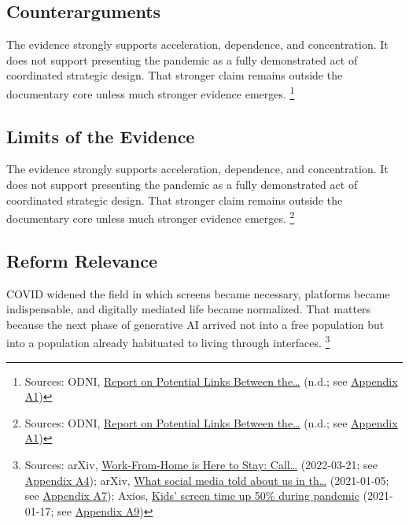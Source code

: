 \documentclass[
  american,
  11pt,
  letterpaper,
]{article}
\begin{document}
\subsection{Counterarguments}\label{counterarguments}

The evidence strongly supports acceleration, dependence, and
concentration. It does not support presenting the pandemic as a fully
demonstrated act of coordinated strategic design. That stronger claim
remains outside the documentary core unless much stronger evidence
emerges. \footnote{Sources: ODNI,
  \href{https://www.dni.gov/files/ODNI/documents/assessments/Report-on-Potential-Links-Between-the-Wuhan-Institute-of-Virology-and-the-Origins-of-COVID-19-20230623.pdf}{Report
  on Potential Links Between the\ldots{}} (n.d.; see
  \hyperref[appendix-a1-report-on-potential-links-between-the-wuhan-institute-of-virology-and-the-origins-of-covid-19]{Appendix
  A1})}

\subsection{Limits of the Evidence}\label{limits-of-the-evidence}

The evidence strongly supports acceleration, dependence, and
concentration. It does not support presenting the pandemic as a fully
demonstrated act of coordinated strategic design. That stronger claim
remains outside the documentary core unless much stronger evidence
emerges. \footnote{Sources: ODNI,
  \href{https://www.dni.gov/files/ODNI/documents/assessments/Report-on-Potential-Links-Between-the-Wuhan-Institute-of-Virology-and-the-Origins-of-COVID-19-20230623.pdf}{Report
  on Potential Links Between the\ldots{}} (n.d.; see
  \hyperref[appendix-a1-report-on-potential-links-between-the-wuhan-institute-of-virology-and-the-origins-of-covid-19]{Appendix
  A1})}

\subsection{Reform Relevance}\label{reform-relevance}

COVID widened the field in which screens became necessary, platforms
became indispensable, and digitally mediated life became normalized.
That matters because the next phase of generative AI arrived not into a
free population but into a population already habituated to living
through interfaces. \footnote{Sources: arXiv,
  \href{https://arxiv.org/abs/2203.11136}{Work-From-Home is Here to
  Stay: Call\ldots{}} (2022-03-21; see
  \hyperref[appendix-a4-work-from-home-is-here-to-stay-call-for-flexibility-in-post-pandemic-work-policies]{Appendix
  A4}); arXiv, \href{https://arxiv.org/abs/2101.01688}{What social media
  told about us in th\ldots{}} (2021-01-05; see
  \hyperref[appendix-a7-what-social-media-told-about-us-in-the-time-of-covid-19-a-scoping-review]{Appendix
  A7}); Axios,
  \href{https://www.axios.com/2021/01/17/kids-screen-time-pandemic}{Kids'
  screen time up 50\% during pandemic} (2021-01-17; see
  \hyperref[appendix-a9-kids-screen-time-up-50-during-pandemic]{Appendix
  A9})}
\end{document}
